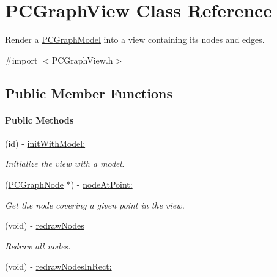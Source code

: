 \hypertarget{interface_p_c_graph_view}{
\section{PCGraphView Class Reference}
\label{interface_p_c_graph_view}
}


Render a \hyperlink{interface_p_c_graph_model}{PCGraphModel} into a view containing its nodes and edges.  




{\ttfamily \#import $<$PCGraphView.h$>$}

\subsection*{Public Member Functions}
\begin{Indent}\paragraph*{Public Methods}
\begin{DoxyCompactItemize}
\item 
\hypertarget{interface_p_c_graph_view_a0d83b963c6f2bc4639002f7eaecc6435}{
(id) -\/ \hyperlink{interface_p_c_graph_view_a0d83b963c6f2bc4639002f7eaecc6435}{initWithModel:}}
\label{interface_p_c_graph_view_a0d83b963c6f2bc4639002f7eaecc6435}

\begin{DoxyCompactList}\small\item\em Initialize the view with a model. \end{DoxyCompactList}\item 
\hypertarget{interface_p_c_graph_view_ab943d38e1a4e53a4734f57acfe273bba}{
(\hyperlink{interface_p_c_graph_node}{PCGraphNode} $\ast$) -\/ \hyperlink{interface_p_c_graph_view_ab943d38e1a4e53a4734f57acfe273bba}{nodeAtPoint:}}
\label{interface_p_c_graph_view_ab943d38e1a4e53a4734f57acfe273bba}

\begin{DoxyCompactList}\small\item\em Get the node covering a given point in the view. \end{DoxyCompactList}\item 
\hypertarget{interface_p_c_graph_view_a75b31f06f65b6059371224ea398dd62f}{
(void) -\/ \hyperlink{interface_p_c_graph_view_a75b31f06f65b6059371224ea398dd62f}{redrawNodes}}
\label{interface_p_c_graph_view_a75b31f06f65b6059371224ea398dd62f}

\begin{DoxyCompactList}\small\item\em Redraw all nodes. \end{DoxyCompactList}\item 
\hypertarget{interface_p_c_graph_view_ae993edc2f08ea39d3e4d19cca31bca61}{
(void) -\/ \hyperlink{interface_p_c_graph_view_ae993edc2f08ea39d3e4d19cca31bca61}{redrawNodesInRect:}}
\label{interface_p_c_graph_view_ae993edc2f08ea39d3e4d19cca31bca61}


\end{DoxyCompactItemize}
\end{Indent}
